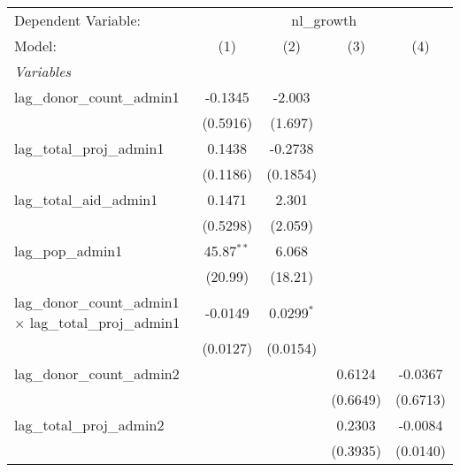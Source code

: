 
\begingroup
\centering
\begin{tabular}{lcccc}
   \tabularnewline \midrule \midrule
   Dependent Variable: & \multicolumn{4}{c}{nl\_growth}\\
   Model:                                                             & (1)          & (2)          & (3)      & (4)\\  
   \midrule
   \emph{Variables}\\
   lag\_donor\_count\_admin1                                          & -0.1345      & -2.003       &          &   \\   
                                                                      & (0.5916)     & (1.697)      &          &   \\   
   lag\_total\_proj\_admin1                                           & 0.1438       & -0.2738      &          &   \\   
                                                                      & (0.1186)     & (0.1854)     &          &   \\   
   lag\_total\_aid\_admin1                                            & 0.1471       & 2.301        &          &   \\   
                                                                      & (0.5298)     & (2.059)      &          &   \\   
   lag\_pop\_admin1                                                   & 45.87$^{**}$ & 6.068        &          &   \\   
                                                                      & (20.99)      & (18.21)      &          &   \\   
   lag\_donor\_count\_admin1 $\times$ lag\_total\_proj\_admin1        & -0.0149      & 0.0299$^{*}$ &          &   \\   
                                                                      & (0.0127)     & (0.0154)     &          &   \\   
   lag\_donor\_count\_admin2                                          &              &              & 0.6124   & -0.0367\\   
                                                                      &              &              & (0.6649) & (0.6713)\\   
   lag\_total\_proj\_admin2                                           &              &              & 0.2303   & -0.0084\\   
                                                                      &              &              & (0.3935) & (0.0140)\\   

\end{tabular}
